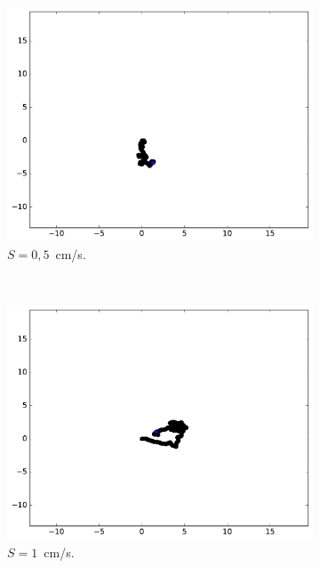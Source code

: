 	\begin{figure}[htb]
		\centering
		\begin{subfigure}[t]{\subImgWmo}
			\centering
			\includegraphics[width=\textwidth]{figures/ch3/spTraj_0_5_120_2}
			\caption[$S = 0,5$]{$S = 0,5$~cm/s.}
			\label{fig:spTraj_0_5_120_2}
		\end{subfigure}
		~
		\begin{subfigure}[t]{\subImgWmo}
			\centering
			\includegraphics[width=\textwidth]{figures/ch3/spTraj_1_0_120_2}
			\caption[$S = 1$]{$S = 1$~cm/s.}
			\label{fig:spTraj_1_0_120_2}
		\end{subfigure}
		~
		\begin{subfigure}[t]{\subImgWmo}

\end{subfigure}
\end{figure}
